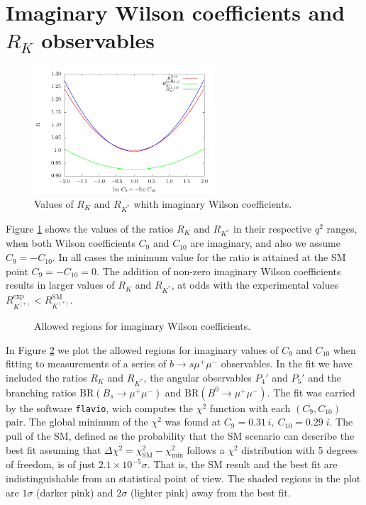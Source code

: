 \documentclass[11pt, a4paper]{article}
\begin{document}
\section{Imaginary Wilson coefficients and $R_K$ observables}
\begin{figure}[H]
\centering
\includegraphics[width = 0.6\textwidth]{Figures/RK_im}
\caption{Values of $R_K$ and $R_{K^*}$ whith imaginary Wilson coefficients.}
\label{im:RK_im}
\end{figure}

 Figure \ref{im:RK_im} shows the values of the ratios $R_K$ and $R_{K^*}$ in their respective $q^2$ ranges, when both Wilson coefficients $C_9$ and $C_{10}$ are imaginary, and also we assume $C_9 = -C_{10}$. In all cases the minimum value for the ratio is attained at the SM point $C_9 = -C_{10} =0$. The addition of non-zero imaginary Wilson coefficients results in larger values of $R_K$ and $R_{K^*}$, at odds with the experimental values $R_{K^{(*)}}^{\mathrm{exp}} < R_{K^{(*)}}^{\mathrm{SM}}$.

\begin{figure}[H]
\centering
\resizebox{0.6\textwidth}{!}{}
\caption{Allowed regions for imaginary Wilson coefficients.}
\label{im:fitim}
\end{figure}

In Figure \ref{im:fitim} we plot the allowed regions for imaginary values of $C_9$ and $C_{10}$ when fitting to measurements of a series of $b\to s \mu^+\mu^-$ observables. In the fit we have included the ratios $R_K$ and $R_{K^*}$, the angular observables $P_4'$ and $P_5'$ and the branching ratios $\mathrm{BR}(B_s\to \mu^+ \mu^-)$ and $\mathrm{BR}(B^0 \to \mu^+ \mu^-)$. The fit was carried by the software \texttt{flavio}, wich computes the $\chi^2$ function with each $(C_9, C_{10})$ pair. The global minimum of the $\chi^2$ was found at $C_9 = 0.31\,i,\ C_{10} = 0.29\;i$. The pull of the SM, defined as the probability that the SM scenario can describe the best fit assuming that $\Delta \chi^2 = \chi^2_{\mathrm{SM}} - \chi^2_{\mathrm{min}}$ follows a $\chi^2$ distribution with 5 degrees of freedom, is of just $2.1\times 10^{-5} \sigma$. That is, the SM result and the best fit are indistinguishable from an statistical point of view. The shaded regions in the plot are $1\sigma$ (darker pink) and $2\sigma$ (lighter pink) away from the best fit.
\end{document}
